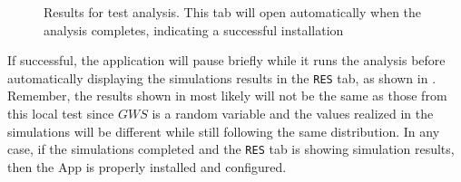 \begin{figure}[!htbp]
  \caption{Results for test analysis. This tab will open automatically
  when the analysis completes, indicating a successful installation}
  \label{fig:show_results}
\end{figure}



If successful, the application will pause briefly while it runs the
analysis before automatically displaying the simulations results in
the \texttt{RES} tab, as shown
in . Remember, the results shown
in  most likely will not be the same as
those from this local test since $GWS$ is a random variable and
the values realized in the simulations will be different while still
following the same distribution. In any case, if the simulations
completed and the \texttt{RES} tab is showing simulation results, then
the \texttt{\getsoftwarename{}} App is properly installed and configured.
